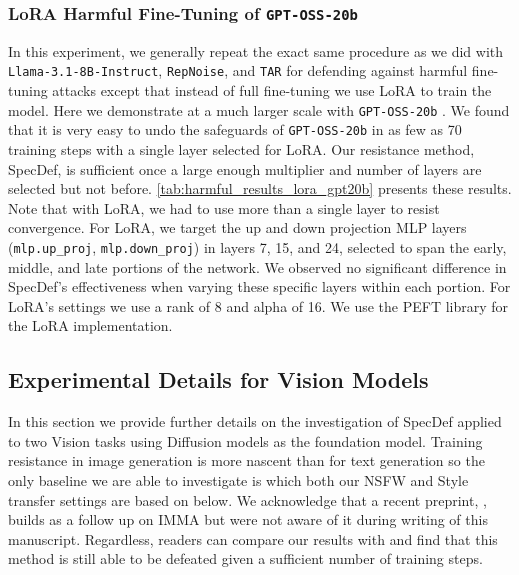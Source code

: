 \documentclass{article}
\theoremstyle{plain}
\theoremstyle{definition}
\theoremstyle{remark}
\begin{document}
\subsubsection{LoRA Harmful Fine-Tuning of \texttt{GPT-OSS-20b}}
\label{app:lora-harmful-fine-tuning-gpt-oss-20b}

In this experiment, we generally repeat the exact same procedure as we did with \texttt{Llama-3.1-8B-Instruct}, \texttt{RepNoise}, and \texttt{TAR} for defending against harmful fine-tuning attacks except that instead of full fine-tuning we use LoRA to train the model. Here we demonstrate at a much larger scale with \texttt{GPT-OSS-20b} \citep{openai2025gptoss120bgptoss20bmodel}. We found that it is very easy to undo the safeguards of \texttt{GPT-OSS-20b} in as few as 70 training steps with a single layer selected for LoRA. Our resistance method, SpecDef, is sufficient once a large enough multiplier and number of layers are selected but not before. \cref{tab:harmful_results_lora_gpt20b} presents these results. Note that with LoRA, we had to use more than a single layer to resist convergence. For LoRA, we target the up and down projection MLP layers (\texttt{mlp.up\_proj}, \texttt{mlp.down\_proj}) in layers 7, 15, and 24, selected to span the early, middle, and late portions of the network. We observed no significant difference in SpecDef's effectiveness when varying these specific layers within each portion. For LoRA's settings we use a rank of 8 and alpha of 16. We use the PEFT library for the LoRA implementation.

\subsection{Experimental Details for Vision Models}
\label{app:NSFW}

In this section we provide further details on the investigation of SpecDef applied to two Vision tasks using Diffusion models as the foundation model. Training resistance in image generation is more nascent than for text generation so the only baseline we are able to investigate is \citet{zheng2024imma} which both our NSFW and Style transfer settings are based on below. We acknowledge that a recent preprint, \citet{abdalla2025gift}, builds as a follow up on IMMA but were not aware of it during writing of this manuscript. Regardless, readers can compare our results with \citet{abdalla2025gift} and find that this method is still able to be defeated given a sufficient number of training steps.
\end{document}

